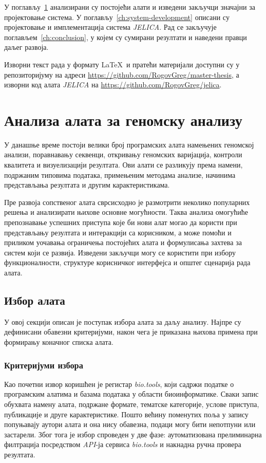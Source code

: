 \documentclass[12pt,oneside]{memoir}
\begin{document}
У поглављу~\ref{ch:genomic-analysis-tool-analysis} анализирани су постојећи алати и изведени закључци значајни за пројектовање система. У поглављу~\ref{ch:system-development} описани су пројектовање и имплементација система \textit{JELICA}. Рад се закључује поглављем~\ref{ch:conclusion}, у којем су сумирани резултати и наведени правци даљег развоја.

\enlargethispage{\baselineskip}
Изворни текст рада у формату \LaTeX\ и пратећи материјали доступни су у репозиторијуму на адреси \url{https://github.com/RogovGreg/master-thesis}, а изворни код алата \textit{JELICA} на  \url{https://github.com/RogovGreg/jelica}.

\chapter{Анализа алата за геномску анализу}
\label{ch:genomic-analysis-tool-analysis}
У данашње време постоји велики број програмских алата намењених геномској анализи, поравнавању секвенци, откривању геномских варијација, контроли квалитета и визуелизацији резултата. Ови алати се разликују према намени, подржаним типовима података, примењеним методама анализе, начинима представљања резултата и другим карактеристикама.

Пре развоја сопственог алата сврсисходно је размотрити неколико популарних решења и анализирати њихове основне могућности. Таква анализа омогућиће препознавање успешних приступа које би нови алат могао да користи при представљању резултата и интеракцији са корисником, а може помоћи и приликом уочавања ограничења постојећих алата и формулисања захтева за систем који се развија. Изведени закључци могу се користити при избору функционалности, структуре корисничког интерфејса и општег сценарија рада алата.


\section{Избор алата}
У овој секцији описан је поступак избора алата за даљу анализу. Најпре су дефинисани обавезни критеријуми, након чега је приказана њихова примена при формирању коначног списка алата.

\subsection{Критеријуми избора}
Као почетни извор коришћен је регистар \textit{bio.tools}, који садржи податке о програмским алатима и базама података у области биоинформатике. Сваки запис обухвата намену алата, подржане формате, тематске категорије, услове приступа, публикације и друге карактеристике. Пошто већину поменутих поља у запису попуњавају аутори алата и она нису обавезна, подаци могу бити непотпуни или застарели. Због тога је избор спроведен у две фазе: аутоматизована прелиминарна филтрација посредством \textit{API}-ја сервиса \textit{bio.tools} и накнадна ручна провера резултата.
\end{document}
